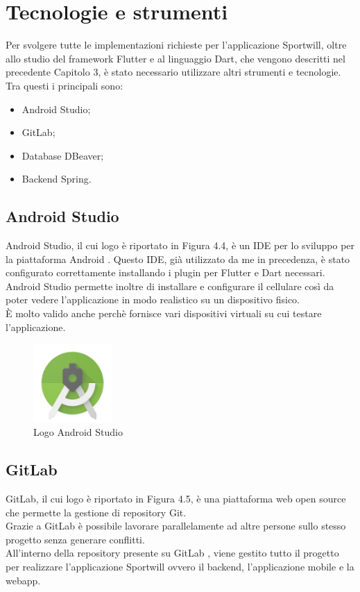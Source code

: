 \newpage

\section{Tecnologie e strumenti}
Per svolgere tutte le implementazioni richieste per l'applicazione Sportwill, oltre allo studio del framework Flutter e al linguaggio Dart, che vengono descritti nel precedente Capitolo 3, è stato necessario utilizzare altri strumenti e tecnologie.\\
Tra questi i principali sono:
\begin{itemize}
	\item Android Studio;
	\item GitLab;
	\item Database DBeaver;
	\item Backend Spring.
\end{itemize}

\subsection{Android Studio}
Android Studio, il cui logo è riportato in Figura 4.4, è un IDE per lo sviluppo per la piattaforma Android \cite{android}.
Questo IDE, già utilizzato da me in precedenza, è stato configurato correttamente installando i plugin per Flutter e Dart necessari.\\
Android Studio permette inoltre di installare e configurare il cellulare così da poter vedere l'applicazione in modo realistico su un dispositivo fisico.\\
È molto valido anche perchè fornisce vari dispositivi virtuali su cui testare l'applicazione.

\begin{figure}[htbp]	
	\centering
	\includegraphics[width=3cm]{immagini/logoandroidstudio.png}
	\caption{Logo Android Studio}
	\label{fig:Logo Android Studio}
\end{figure}

\subsection{GitLab}
GitLab, il cui logo è riportato in Figura 4.5, è una piattaforma web open source che permette la gestione di repository Git.\\
Grazie a GitLab è possibile lavorare parallelamente
ad altre persone sullo stesso progetto senza generare conflitti.\\
All'interno della repository presente su GitLab \cite{repo}, viene gestito tutto il progetto per realizzare l'applicazione Sportwill ovvero il backend, l'applicazione mobile e la webapp.\\

